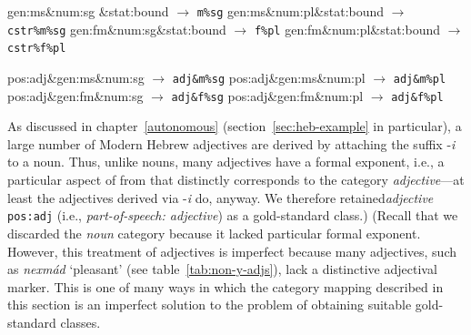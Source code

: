 {\begin{description}
\begin{exe}
\ex \label{ex:cstr-cats} 
\begin{xlist}
		\ex gen:ms\&num:sg \&stat:bound \quad $\to$ \quad \texttt{m\%sg} \label{ex:cstr:m-sg}
		\ex gen:ms\&num:pl\&stat:bound \quad $\to$ \quad \texttt{cstr\%m\%sg} \label{ex:cstr:m-pl}
		\ex gen:fm\&num:sg\&stat:bound  \quad $\to$ \quad \texttt{f\%pl} \label{ex:cstr:f-sg}
		\ex gen:fm\&num:pl\&stat:bound \quad $\to$ \quad \texttt{cstr\%f\%pl} \label{ex:cstr:f-pl}
	\end{xlist}
\ex \label{ex:adj-cats} 
\begin{xlist}
		\ex pos:adj\&gen:ms\&num:sg \quad $\to$ \quad \texttt{adj\&m\%sg} \label{ex:adj:m-sg}
		\ex pos:adj\&gen:ms\&num:pl \quad $\to$ \quad \texttt{adj\&m\%pl} \label{ex:adj:m-pl}
		\ex pos:adj\&gen:fm\&num:sg \quad $\to$ \quad \texttt{adj\&f\%sg} \label{ex:adj:f-sg}
		\ex pos:adj\&gen:fm\&num:pl \quad $\to$ \quad \texttt{adj\&f\%pl} \label{ex:adj:f-pl}
	\end{xlist}
\end{exe}

\item[Adjectives.]
As discussed in chapter~\ref{autonomous} (section~\ref{sec:heb-example} in particular), 
a large number of Modern Hebrew adjectives are derived by attaching the 
suffix -\textit{i}
to a noun. Thus, unlike nouns, many adjectives have a formal exponent, i.e., a particular aspect of from that distinctly corresponds to the category \emph{adjective}---at least the adjectives derived via -\textit{i} do, anyway. 
We therefore retained\emph{adjective} 
\texttt{pos:adj} (i.e., \textit{part-of-speech: adjective}) as a gold-standard class.)
(Recall that we discarded the \emph{noun} category because it lacked particular formal exponent. 
However, this treatment of adjectives is imperfect because many adjectives, such as
\textit{nexm\'{a}d} `pleasant' (see table~\ref{tab:non-y-adjs}),
lack a distinctive adjectival marker.  This is one of many ways in which the category mapping described in this section is an imperfect solution to the problem of obtaining suitable gold-standard classes.  
 

\end{description}}
